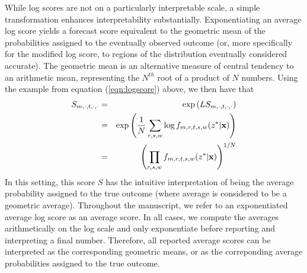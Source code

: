 \documentclass[9pt,twocolumn,twoside]{pnas-new}\usepackage[]{graphicx}\usepackage[]{color}
\begin{document}
{While log scores are not on a particularly interpretable scale, a simple transformation enhances interpretability substantially.
Exponentiating an average log score yields a forecast score equivalent to the geometric mean of the probabilities assigned to the eventually observed outcome (or, more specifically for the modified log score, to regions of the distribution eventually considered accurate). 
The geometric mean is an alternative measure of central tendency to an arithmetic mean, representing the $N^{th}$ root of a product of $N$ numbers. 
Using the example from equation (\ref{eqn:logscore}) above, we then have that
\begin{eqnarray}
S_{m,\cdot,t,\cdot,\cdot} &=& \exp \left ( LS_{m,\cdot,t,\cdot,\cdot} \right ) \nonumber \\
& = & \exp \left ( \frac{1}{N} \sum_{r,s,w} \log f_{m,r,t,s,w}(z^*|{\bf x}) \right ) \nonumber \\
 & = & \left ( \prod_{r,s,w}  f_{m,r,t,s,w}(z^*|{\bf x}) \right ) ^{1/N} 
\end{eqnarray}
In this setting, this score $S$ has the intuitive interpretation of being the average probability assigned to the true outcome (where average is considered to be a geometric average).
Throughout the manuscript, we refer to an exponentiated average log score as an average score.
In all cases, we compute the averages arithmetically on the log scale and only exponentiate before reporting and interpreting a final number.
Therefore, all reported average scores can be interpreted as the corresponding geometric means, or as the correponding average probabilities assigned to the true outcome.

}
\end{document}
